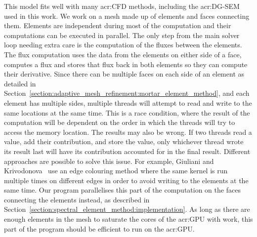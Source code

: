 This model fits well with many \acrshort{acr:CFD} methods, including the \acrshort{acr:DG-SEM} used
in this work. We work on a mesh made up of elements and faces connecting them. Elements are
independent during most of the computation and their computations can be executed in parallel. The
only step from the main solver loop needing extra care is the computation of the fluxes between the
elements. The flux computation uses the data from the elements on either side of a face, computes a
flux and stores that flux back in both elements so they can compute their derivative. Since there
can be multiple faces on each side of an element as detailed in
Section~\ref{section:adaptive_mesh_refinement:mortar_element_method}, and each element has multiple
sides, multiple threads will attempt to read and write to the same locations at the same time. This
is a race condition, where the result of the computation will be dependent on the order in which the
threads will try to access the memory location. The results may also be wrong. If two threads read a
value, add their contribution, and store the value, only whichever thread wrote its result last will
have its contribution accounted for in the final result. Different approaches are possible to solve
this issue. For example, Giuliani and Krivodonova~\cite{Giuliani2019} use an edge colouring method
where the same kernel is run multiple times on different edges in order to avoid writing to the
elements at the same time. Our program parallelises this part of the computation on the faces
connecting the elements instead, as described in
Section~\ref{section:spectral_element_method:implementation}. As long as there are enough elements
in the mesh to saturate the cores of the \acrshort{acr:GPU} with work, this part of the program
should be efficient to run on the \acrshort{acr:GPU}.

